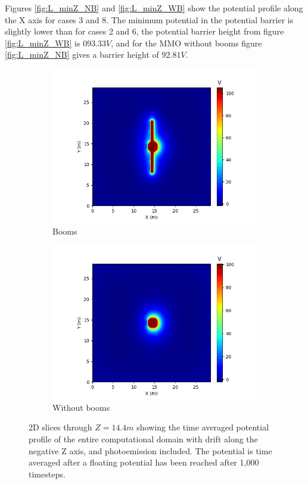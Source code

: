 Figures \ref{fig:L_minZ_NB} and \ref{fig:L_minZ_WB} show the potential profile along the X axis for cases 3 and 8. The minimum potential in the potential barrier is slightly lower than for cases 2 and 6, the potential barrier height from figure \ref{fig:L_minZ_WB} is $093.33 V$, and for the MMO without booms figure \ref{fig:L_minZ_NB} gives a barrier height of $92.81 V$.

\begin{figure}[H]
  \begin{subfigure}[b]{0.6\textwidth}
    \includegraphics[width=\textwidth]{figures/MMO/minZ/WB/P_minZ_WB.png}
    \caption{Booms}
    \label{fig:P_minZ_WB}
  \end{subfigure}
  \hfill
  \begin{subfigure}[b]{0.6\textwidth}
    \includegraphics[width=\textwidth]{figures/MMO/minZ/NB/P_minZ_NB.png}
    \caption{Without booms}
    \label{fig:P_minZ_NB}
  \end{subfigure}
  \caption{2D slices through $Z = 14.4 m$ showing the time averaged potential profile of the entire computational domain with drift along the negative Z axis, and photoemission included. The potential is time averaged after a floating potential has been reached after 1,000 timesteps.}
\label{fig:Pot_minZ}
\end{figure}


